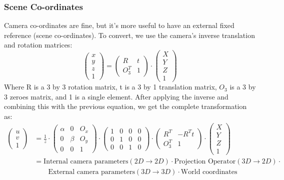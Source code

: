 \subsubsection{Scene Co-ordinates}
Camera co-ordinates are fine, but it's more useful to have an external fixed reference (scene co-ordinates). To convert, we use the camera's inverse translation and rotation matrices:
\begin{equation}
    \begin{pmatrix}
    x \\ y\\ z\\1
    \end{pmatrix}
    =  
    \begin{pmatrix}
    R & t \\
    O^T_3 & 1
    \end{pmatrix}
    \cdot     \begin{pmatrix}
    X \\ Y\\ Z\\1
    \end{pmatrix}
\end{equation}
Where R is a 3 by 3 rotation matrix, t is a 3 by 1 translation matrix, $O_3$ is a 3 by 3 zeroes matrix, and 1 is a single element. After applying the inverse and combining this with the previous equation, we get the complete transformation as:
\begin{align}
      \begin{pmatrix}
    u \\ v \\ 1
    \end{pmatrix}
    &=  \frac{1}{z} \cdot
    \begin{pmatrix}
    \alpha & 0 & O_x\\
    0 & \beta & O_y \\
    0 & 0 & 1 
    \end{pmatrix} \cdot 
    \begin{pmatrix}
    1 & 0 & 0 & 0\\
    0 & 1 & 0 & 0\\
    0 & 0 & 1 & 0
    \end{pmatrix}
    \cdot   
    \begin{pmatrix}
    R^T & -R^Tt \\
    O^T_3 & 1
    \end{pmatrix}
    \cdot
    \begin{pmatrix}
    X \\ Y\\ Z\\ 1
    \end{pmatrix}  \\
    &= \text{Internal camera parameters}(2D \rightarrow 2D)  \cdot
    \text{Projection Operator}(3D\rightarrow 2D) \cdot \nonumber \\ &\quad \quad \text{External camera parameters}(3D\rightarrow 3D) \cdot  \text{World coordinates} \nonumber
\end{align}


